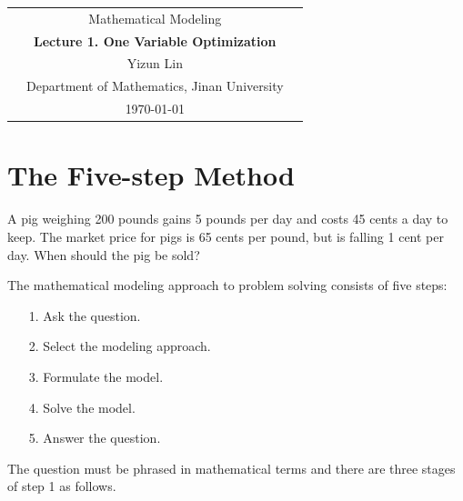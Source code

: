 \newpage
\begin{center}
\begin{tabular}{|c c c|}
\hline
& Mathematical Modeling & \\
& \textbf{Lecture 1. One Variable Optimization}  &  \\
& {\small Yizun Lin} &  \\
& Department of Mathematics, Jinan University & \\
& \today & \\
\hline
\end{tabular}
\end{center}
\vspace{1em}

\section{The Five-step Method}
\begin{example}\label{PigExamp1}
A pig weighing 200 pounds gains 5 pounds per day and costs 45 cents a day to keep. The market price for pigs is 65 cents per pound, but is falling 1 cent per day. When should the pig be sold?
\end{example}

\hspace{-1.5em}The mathematical modeling approach to problem solving consists of five steps:
\begin{itemize}
\item[1.] Ask the question.
\item[2.] Select the modeling approach.
\item[3.] Formulate the model.
\item[4.] Solve the model.
\item[5.] Answer the question.
\end{itemize}

\vspace{1em}
\hspace{-1.5em}{\bf Step 1. Ask the question}

The question must be phrased in mathematical terms and there are three stages of step 1 as follows.


